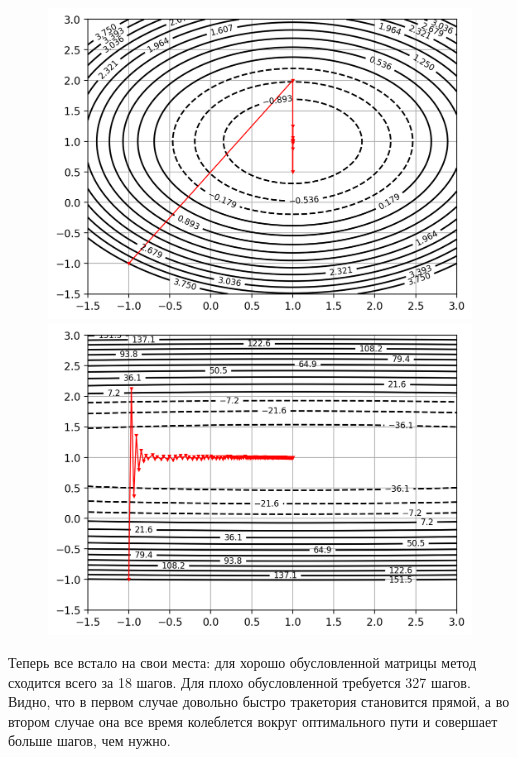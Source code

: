 \documentclass[notitlepage]{article}
\begin{document}
\begin{figure}[ht]
\begin{minipage}[t]{.5\textwidth}
  \centering
  \includegraphics[width=\textwidth, keepaspectratio]{plots/trajectory_0_1.png}
\end{minipage}
\begin{minipage}[t]{.5\textwidth}
  \centering
  \includegraphics[width=\textwidth, keepaspectratio]{plots/trajectory_1_1.png}
\end{minipage}
\end{figure}
Теперь все встало на свои места: для хорошо обусловленной матрицы метод сходится всего за 18 шагов. Для плохо обусловленной
требуется 327 шагов. Видно, что в первом случае довольно быстро тракетория становится прямой, а во втором случае она все время
колеблется вокруг оптимального пути и совершает больше шагов, чем нужно.
\end{document}
